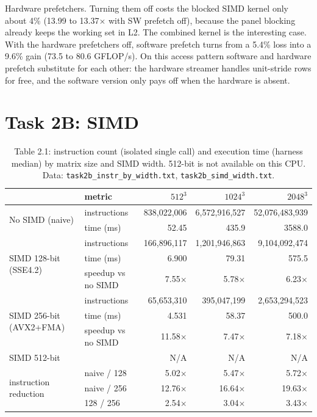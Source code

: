 \documentclass[11pt,a4paper]{article}
\begin{document}
Hardware prefetchers. Turning them off costs the blocked SIMD kernel only about 4\% (13.99 to 13.37$\times$ with SW prefetch off), because the panel blocking already keeps the working set in L2. The combined kernel is the interesting case. With the hardware prefetchers off, software prefetch turns from a 5.4\% loss into a 9.6\% gain (73.5 to 80.6 GFLOP/s). On this access pattern software and hardware prefetch substitute for each other: the hardware streamer handles unit-stride rows for free, and the software version only pays off when the hardware is absent.

\section{Task 2B: SIMD}

\begin{table}[H]
\centering\small
\caption{Table 2.1: instruction count (isolated single call) and execution time (harness median) by matrix size and SIMD width. 512-bit is not available on this CPU. Data: \texttt{task2b\_instr\_by\_width.txt}, \texttt{task2b\_simd\_width.txt}.}
\label{tab:21}
\begin{tabular}{l l rrr}
\toprule
& metric & $512^3$ & $1024^3$ & $2048^3$ \\
\midrule
\multirow{2}{*}{No SIMD (naive)} & instructions & 838,022,006 & 6,572,916,527 & 52,076,483,939 \\
 & time (ms) & 52.45 & 435.9 & 3588.0 \\
\midrule
\multirow{3}{*}{SIMD 128-bit (SSE4.2)} & instructions & 166,896,117 & 1,201,946,863 & 9,104,092,474 \\
 & time (ms) & 6.900 & 79.31 & 575.5 \\
 & speedup vs no SIMD & 7.55$\times$ & 5.78$\times$ & 6.23$\times$ \\
\midrule
\multirow{3}{*}{SIMD 256-bit (AVX2+FMA)} & instructions & 65,653,310 & 395,047,199 & 2,653,294,523 \\
 & time (ms) & 4.531 & 58.37 & 500.0 \\
 & speedup vs no SIMD & 11.58$\times$ & 7.47$\times$ & 7.18$\times$ \\
\midrule
SIMD 512-bit & & N/A & N/A & N/A \\
\midrule
\multirow{3}{*}{instruction reduction} & naive / 128 & 5.02$\times$ & 5.47$\times$ & 5.72$\times$ \\
 & naive / 256 & 12.76$\times$ & 16.64$\times$ & 19.63$\times$ \\
 & 128 / 256 & 2.54$\times$ & 3.04$\times$ & 3.43$\times$ \\
\bottomrule
\end{tabular}
\end{table}
\end{document}
